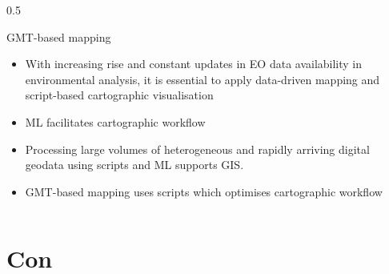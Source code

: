 \documentclass[pdflatex,compress,8pt,
	xcolor={dvipsnames,dvipsnames,svgnames,x11names,table},
	hyperref={colorlinks = true, breaklinks = true, urlcolor = NavyBlue, linkcolor=white, breaklinks = true}]{beamer}
\begin{document}
\begin{frame}
\begin{minipage}[0.4\textheight]{\textwidth}
\begin{columns}[T]
\begin{column}{0.5\textwidth}
\begin{alertblock}{GMT-based mapping}
\begin{itemize}
     \item With increasing rise and constant updates in EO data availability in environmental analysis, it is essential to apply data-driven mapping and script-based cartographic visualisation 
      \item ML facilitates cartographic workflow
       \item Processing large volumes of heterogeneous and rapidly arriving digital geodata using scripts and ML supports GIS. 
       \item GMT-based mapping uses scripts which optimises cartographic workflow
\end{itemize} 
\end{alertblock}
\end{column}
\end{columns}
\end{minipage}
\end{frame}

\section{Con}
\end{document}
